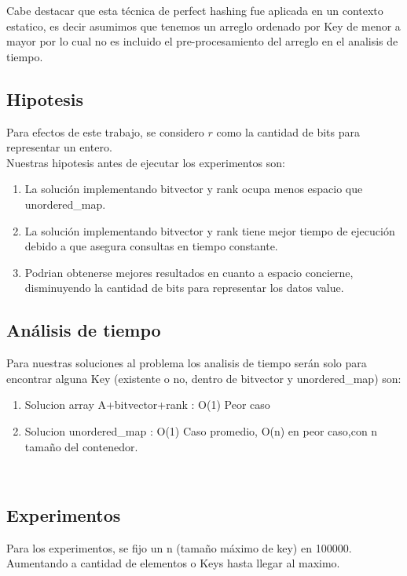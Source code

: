 \documentclass[11pt]{article}
\begin{document}
Cabe destacar que esta técnica de perfect hashing fue aplicada en un contexto estatico, es decir asumimos que tenemos un arreglo ordenado por Key de menor a mayor por lo cual no es incluido el pre-procesamiento del arreglo en el analisis de tiempo.
\subsection{Hipotesis}
Para efectos de este trabajo, se considero $r$ como la cantidad de bits para representar un entero. 
\\
Nuestras hipotesis antes de ejecutar los experimentos son:
\begin{enumerate}
    \item La solución implementando bitvector y rank ocupa menos espacio que unordered\_map.
    \item La solución implementando bitvector y rank tiene mejor tiempo de ejecución debido a que asegura consultas en tiempo constante.
    \item Podrian obtenerse mejores resultados en cuanto a espacio concierne, disminuyendo la cantidad de bits para representar los datos value.
\end{enumerate}


\subsection{Análisis de tiempo}
Para nuestras soluciones al problema los analisis de tiempo serán solo para encontrar alguna Key (existente o no, dentro de bitvector y unordered\_map) son:
\begin{enumerate}
    \item Solucion array A+bitvector+rank : O(1) Peor caso
    \item Solucion unordered\_map : O(1) Caso promedio, O(n) en peor caso,con n tamaño del contenedor.
\end{enumerate}
\\

\subsection{Experimentos}
Para los experimentos, se fijo un n (tamaño máximo de key) en 100000.
Aumentando a cantidad de elementos o Keys hasta llegar al maximo.
\end{document}
